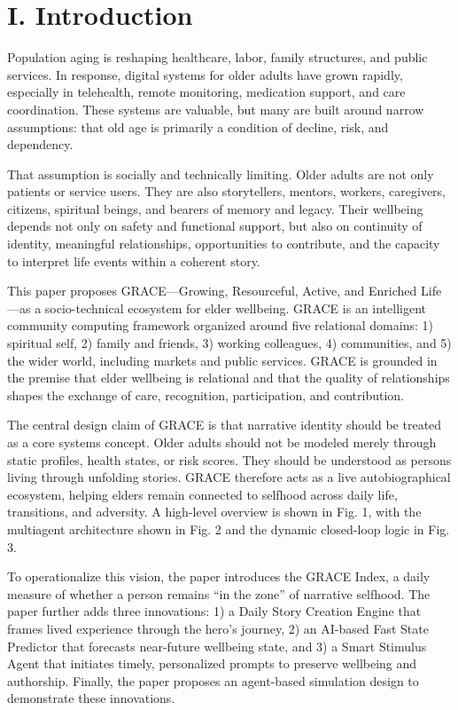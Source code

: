 \documentclass[
  journal,
]{IEEEtran}%
\begin{document}
\section{I. Introduction}\label{i.-introduction}

Population aging is reshaping healthcare, labor, family structures, and
public services. In response, digital systems for older adults have
grown rapidly, especially in telehealth, remote monitoring, medication
support, and care coordination. These systems are valuable, but many are
built around narrow assumptions: that old age is primarily a condition
of decline, risk, and dependency.

That assumption is socially and technically limiting. Older adults are
not only patients or service users. They are also storytellers, mentors,
workers, caregivers, citizens, spiritual beings, and bearers of memory
and legacy. Their wellbeing depends not only on safety and functional
support, but also on continuity of identity, meaningful relationships,
opportunities to contribute, and the capacity to interpret life events
within a coherent story.

This paper proposes GRACE---Growing, Resourceful, Active, and Enriched
Life---as a socio-technical ecosystem for elder wellbeing. GRACE is an
intelligent community computing framework organized around five
relational domains: 1) spiritual self, 2) family and friends, 3) working
colleagues, 4) communities, and 5) the wider world, including markets
and public services. GRACE is grounded in the premise that elder
wellbeing is relational and that the quality of relationships shapes the
exchange of care, recognition, participation, and contribution.

The central design claim of GRACE is that narrative identity should be
treated as a core systems concept. Older adults should not be modeled
merely through static profiles, health states, or risk scores. They
should be understood as persons living through unfolding stories. GRACE
therefore acts as a live autobiographical ecosystem, helping elders
remain connected to selfhood across daily life, transitions, and
adversity. A high-level overview is shown in Fig. 1, with the multiagent
architecture shown in Fig. 2 and the dynamic closed-loop logic in Fig.
3.

To operationalize this vision, the paper introduces the GRACE Index, a
daily measure of whether a person remains ``in the zone'' of narrative
selfhood. The paper further adds three innovations: 1) a Daily Story
Creation Engine that frames lived experience through the hero's journey,
2) an AI-based Fast State Predictor that forecasts near-future wellbeing
state, and 3) a Smart Stimulus Agent that initiates timely, personalized
prompts to preserve wellbeing and authorship. Finally, the paper
proposes an agent-based simulation design to demonstrate these
innovations.
\end{document}
